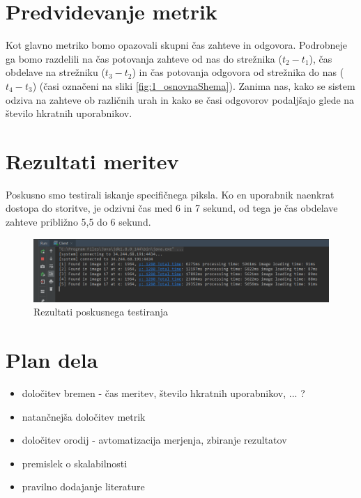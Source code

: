 \section{Predvidevanje metrik}

Kot glavno metriko bomo opazovali skupni čas zahteve in odgovora.
Podrobneje ga bomo razdelili na čas potovanja zahteve od nas do strežnika ($t_2 - t_1$), čas obdelave na strežniku ($t_3 - t_2$) in čas potovanja odgovora od strežnika do nas ($t_4 - t_3$) (časi označeni na sliki \ref{fig:1_osnovnaShema}).
Zanima nas, kako se sistem odziva na zahteve ob različnih urah in kako se časi odgovorov podaljšajo glede na število hkratnih uporabnikov.

\section{Rezultati meritev} %

Poskusno smo testirali iskanje specifičnega piksla.
Ko en uporabnik naenkrat dostopa do storitve, je odzivni čas med 6 in 7 sekund, od tega je čas obdelave zahteve približno 5,5 do 6 sekund.

\begin{figure}[H]
    \centering
    \includegraphics[scale=0.3]{Img/1_preliminary_test.png}
    \caption{Rezultati poskusnega testiranja}
    \label{fig:1_preliminary_test}
\end{figure}

\section{Plan dela}

\begin{itemize}
\item določitev bremen - čas meritev, število hkratnih uporabnikov, ... ?
\item natančnejša določitev metrik 
\item določitev orodij - avtomatizacija merjenja, zbiranje rezultatov
\item premislek o skalabilnosti
\item pravilno dodajanje literature
\end{itemize}


%
%

